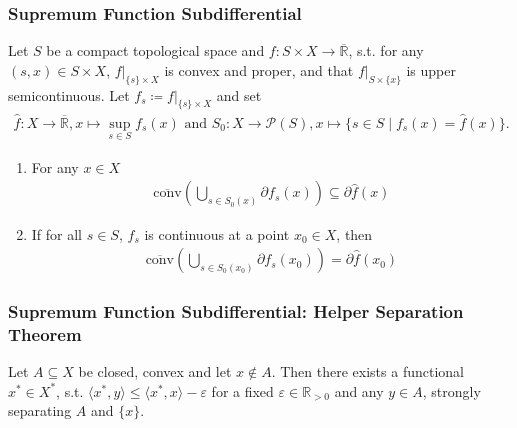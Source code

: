 \documentclass[10pt, hyperref={hidelinks}]{beamer}
\begin{document}
    \begin{frame}
        \frametitle{Supremum Function Subdifferential}
        
        \pause

        \begin{theorem} \label{supremum_theorem}
            Let \(S\) be a compact topological space and \(f\colon S \times X \to \overline{\mathbb{R}}\), s.t. for any \((s, x) \in S \times X\), \(f|_{\{s\} \times X}\) is convex and proper, and that \(f|_{S \times \{x\}}\) is upper semicontinuous. Let \(f_s \coloneqq f|_{\{s\} \times X}\) and set
            \begin{align*}
                \hat{f}\colon X \to \overline{\mathbb{R}}, x \mapsto \sup_{s \in S} f_s(x) \text{ and } S_0\colon X \to \mathcal{P}(S), x \mapsto \{s \in S \mid f_s(x) = \hat{f}(x)\}.
            \end{align*}
            \pause
            \begin{enumerate}[label=(\roman*), wide]
                \item \label{supremum_theorem_1} For any \(x \in X\)
                \begin{align*}
                    \overline{\text{conv}}\left(\bigcup_{s \in S_0(x)} \partial f_s(x)\right) \subseteq \partial \hat{f}(x)
                \end{align*}
                \pause
                \item \label{supremum_theorem_2} If for all \(s \in S\), \(f_s\) is continuous at a point \(x_0 \in X\), then
                \begin{align*}
                    \overline{\text{conv}}\left(\bigcup_{s \in S_0(x_0)} \partial f_s(x_0)\right) = \partial \hat{f}(x_0)
                \end{align*}
            \end{enumerate}
        \end{theorem}
    \end{frame}

    \begin{frame}
        \frametitle{Supremum Function Subdifferential: Helper Separation Theorem}

        \pause
    
        \begin{theorem} \label{separation_theorem}
            Let \(A \subseteq X\) be closed, convex and let \(x \notin A\). Then there exists a functional \(x^* \in X^*\), s.t. \(\langle x^*, y\rangle \leq \langle x^*, x \rangle - \varepsilon\) for a fixed \(\varepsilon \in \mathbb{R}_{> 0}\) and any \(y \in A\), strongly separating \(A\) and \(\{x\}\).
        \end{theorem}
    \end{frame}
\end{document}

